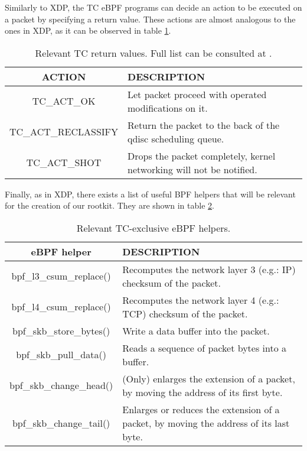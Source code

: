 Similarly to XDP, the TC eBPF programs can decide an action to be executed on a packet by specifying a return value. These actions are almost analogous to the ones in XDP, as it can be observed in table \ref{table:tc_actions}.

\begin{table}[htbp]
\begin{tabular}{|c|>{\centering\arraybackslash}p{10cm}|}
\hline
ACTION & DESCRIPTION\\
\hline
\hline
TC\_ACT\_OK & Let packet proceed with operated modifications on it.\\
\hline
TC\_ACT\_RECLASSIFY & Return the packet to the back of the qdisc scheduling queue.\\
\hline
TC\_ACT\_SHOT & Drops the packet completely, kernel networking will not be notified.\\
\hline
\end{tabular}
\caption{Relevant TC return values. Full list can be consulted at \cite{tc_ret_list_complete}.}
\label{table:tc_actions}
\end{table}

Finally, as in XDP, there exists a list of useful BPF helpers that will be relevant for the creation of our rootkit. They are shown in table \ref{table:tc_helpers}.
\begin{table}[htbp]
\begin{tabular}{|c|>{\centering\arraybackslash}p{10cm}|}
\hline
eBPF helper & DESCRIPTION\\
\hline
\hline
bpf\_l3\_csum\_replace() & Recomputes the network layer 3 (e.g.: IP) checksum of the packet.\\
\hline
bpf\_l4\_csum\_replace() & Recomputes the network layer 4 (e.g.: TCP) checksum of the packet.\\
\hline
bpf\_skb\_store\_bytes() & Write a data buffer into the packet.\\
\hline
bpf\_skb\_pull\_data() & Reads a sequence of packet bytes into a buffer.\\
\hline
bpf\_skb\_change\_head() & (Only) enlarges the extension of a packet, by moving the address of its first byte.\\
\hline
bpf\_skb\_change\_tail() & Enlarges or reduces the extension of a packet, by moving the address of its last byte.\\
\hline
\hline
\end{tabular}
\caption{Relevant TC-exclusive eBPF helpers.}
\label{table:tc_helpers}
\end{table}


